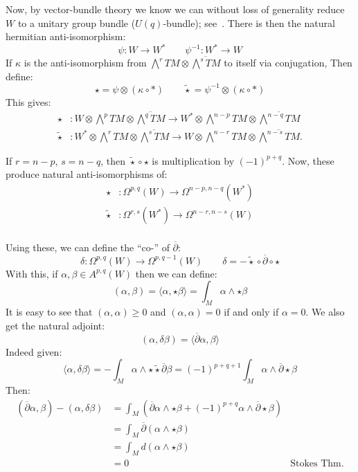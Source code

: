 \documentclass{book}
\begin{document}
Now, by vector-bundle theory we know we can without loss of generality reduce $W$ to a unitary group bundle
($U(q)$-bundle); see~\cite{NateKTheory}. There is then the natural hermitian anti-isomorphism:
\[
  \psi: W \to W^* \qquad \psi^{-1}: W^* \to W
\]
If $\kappa$ is the anti-isomorphism from $\bigwedge^r TM \otimes \overline{\bigwedge^s TM}$ to itself via
conjugation, Then define:
\[
  \star = \psi \otimes (\kappa \circ *) \qquad \widetilde{\star} = \psi^{-1} \otimes (\kappa \circ *)
\]
This gives:
\begin{align*}
\star &: W \otimes \bigwedge^p TM \otimes \overline{\bigwedge^q TM} \to W^* \otimes \bigwedge^{n-p} TM \otimes \overline{\bigwedge^{n-q} TM} \\
\widetilde{\star} &: W^* \otimes \bigwedge^r TM \otimes \overline{\bigwedge^s TM} \to W \otimes \bigwedge^{n-r} TM \otimes \overline{\bigwedge^{n-s} TM}.
\end{align*}

If $r = n-p$, $s = n-q$, then $\widetilde{\star}\circ \star$ is multiplication by $(-1)^{p+q}$. Now, these
produce natural anti-isomorphisms of:
\begin{align*}
  \star&: \Omega^{p,q}(W) \to \Omega^{n-p, n-q}(W^*)\\
  \widetilde{\star}&: \Omega^{r,s}(W^*) \to \Omega^{n-r, n-s}(W)\\
\end{align*}

Using these, we can define the ``co-'' of $\overline{\partial}$:
\[
  \delta: \Omega^{p,q}(W) \to \Omega^{p, q-1}(W) \qquad \delta= -\widetilde{\star} \circ
  \overline{\partial} \circ \star
\]
With this, if $\alpha,\beta \in A^{p,q}(W)$ then we can define:
\[
  \left( \alpha,\beta \right) = \langle \alpha, \star \beta \rangle = \int_M \alpha \wedge  \star \beta
\]
It is easy to see that $\left( \alpha,\alpha \right) \ge 0$ and $\left(\alpha,\alpha  \right) = 0$ if and only
if $\alpha = 0$. We also get the natural adjoint:
\[
  \left(\alpha, \delta \beta\right) = \langle \overline{\partial}\alpha, \beta \rangle
\]
Indeed given:
\[
  \langle\alpha, \delta \beta\rangle = - \int_M \alpha \wedge  \star \widetilde{\star}\overline{\partial} \beta = (-1)^{p+q+1} \int_M \alpha \wedge \overline{\partial} \star \beta
\]
Then:
\begin{align*}
    (\overline{\partial}\alpha, \beta) - (\alpha, \delta \beta) &= \int_M (\overline{\partial}\alpha \wedge \star \beta + (-1)^{p+q} \alpha \wedge \overline{\partial} \star \beta) \\
    &= \int_M \overline{\partial}(\alpha \wedge \star \beta) \\
    &= \int_M d(\alpha \wedge \star \beta) \\
    &= 0 & \text{Stokes Thm.}
\end{align*}
\end{document}

